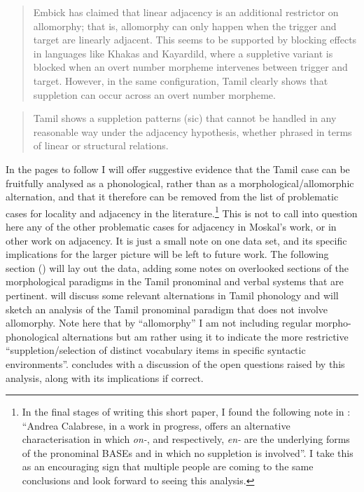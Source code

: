 \documentclass[output=paper]{langscibook}
\begin{document}
\begin{quote}
Embick has claimed that linear adjacency is an additional restrictor on allomorphy; that is, allomorphy can only happen when the trigger and target are linearly adjacent. This seems to be supported by blocking effects in languages like Khakas and Kayardild, where a suppletive variant is blocked when an overt number morpheme intervenes between trigger and target. However, in the same configuration, Tamil clearly shows that suppletion can occur across an overt number morpheme.\hfill\hbox{\citep[107]{Moskal2015}}
\end{quote}
\begin{quote}
Tamil shows a suppletion patterns (sic) that cannot be handled in any reasonable way under the adjacency hypothesis, whether phrased in terms of linear or structural relations.\hfill\hbox{\citep[91]{Moskal2015}}
\end{quote}

In the pages to follow I will offer suggestive evidence that the Tamil case can be fruitfully analysed as a phonological, rather than as a morphological/allomorphic alternation, and that it therefore can be removed from the list of problematic cases for locality and adjacency in the literature.\footnote{In the final stages of writing this short paper, I found the following note in \citet[1054]{SmithBobaljik2019}: “Andrea Calabrese, in a work in progress, offers an alternative characterisation in which \textit{on-}, and respectively, \textit{en-} are the underlying forms of the pronominal BASEs and in which no suppletion is involved”. I take this as an encouraging sign that multiple people are coming to the same conclusions and look forward to seeing this analysis.}  This is not to call into question here any of the other problematic cases for adjacency in Moskal’s work, or in other work on adjacency. It is just a small note on one data set, and its specific implications for the larger picture will be left to future work. The following section () will lay out the data, adding some notes on overlooked sections of the morphological paradigms in the Tamil pronominal and verbal systems that are pertinent.  will discuss some relevant alternations in Tamil phonology and will sketch an analysis of the Tamil pronominal paradigm that does not involve allomorphy. Note here that by “allomorphy” I am not including regular morpho-phonological alternations but am rather using it to indicate the more restrictive “suppletion/selection of distinct vocabulary items in specific syntactic environments”.  concludes with a discussion of the open questions raised by this analysis, along with its implications if correct.
\end{document}
